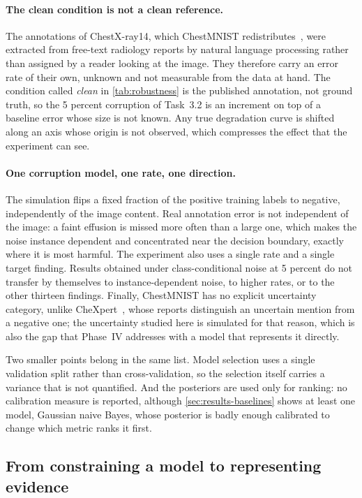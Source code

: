 \paragraph{The clean condition is not a clean reference.}
The annotations of ChestX-ray14, which ChestMNIST
redistributes~\cite{wang2017chestxray8}, were extracted from free-text
radiology reports by natural language processing rather than assigned by a
reader looking at the image. They therefore carry an error rate of their own,
unknown and not measurable from the data at hand. The condition called
\emph{clean} in \cref{tab:robustness} is the published annotation, not ground
truth, so the \num{5} percent corruption of Task~3.2 is an increment on top of a
baseline error whose size is not known. Any true degradation curve is shifted
along an axis whose origin is not observed, which compresses the effect that the
experiment can see.

\paragraph{One corruption model, one rate, one direction.}
The simulation flips a fixed fraction of the positive training labels to
negative, independently of the image content. Real annotation error is not
independent of the image: a faint effusion is missed more often than a large
one, which makes the noise instance dependent and concentrated near the decision
boundary, exactly where it is most harmful. The experiment also uses a single
rate and a single target finding. Results obtained under class-conditional noise
at \num{5} percent do not transfer by themselves to instance-dependent noise, to
higher rates, or to the other thirteen findings. Finally, ChestMNIST has no
explicit uncertainty category, unlike CheXpert~\cite{irvin2019chexpert}, whose
reports distinguish an uncertain mention from a negative one; the uncertainty
studied here is simulated for that reason, which is also the gap that Phase~IV
addresses with a model that represents it directly.

Two smaller points belong in the same list. Model selection uses a single
validation split rather than cross-validation, so the selection itself carries a
variance that is not quantified. And the posteriors are used only for ranking:
no calibration measure is reported, although \cref{sec:results-baselines} shows
at least one model, Gaussian naive Bayes, whose posterior is badly enough
calibrated to change which metric ranks it first.

\subsection{From constraining a model to representing evidence}
\label{sec:results-bridge}

